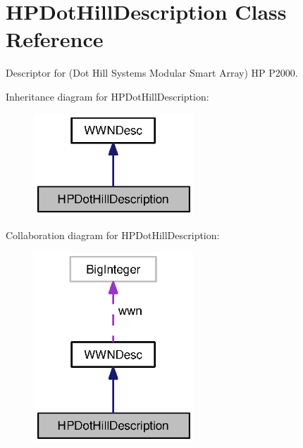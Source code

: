 \section{H\-P\-Dot\-Hill\-Description Class Reference}
\label{classorg_1_1smallfoot_1_1wwn_1_1HPDotHillDescription}


Descriptor for (Dot Hill Systems Modular Smart Array) H\-P P2000.  




Inheritance diagram for H\-P\-Dot\-Hill\-Description\-:\nopagebreak
\begin{figure}[H]
\begin{center}
\leavevmode
\includegraphics[width=170pt]{classorg_1_1smallfoot_1_1wwn_1_1HPDotHillDescription__inherit__graph}
\end{center}
\end{figure}


Collaboration diagram for H\-P\-Dot\-Hill\-Description\-:\nopagebreak
\begin{figure}[H]
\begin{center}
\leavevmode
\includegraphics[width=170pt]{classorg_1_1smallfoot_1_1wwn_1_1HPDotHillDescription__coll__graph}
\end{center}
\end{figure}
